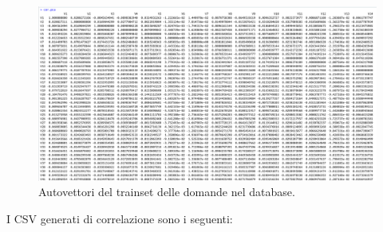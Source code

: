\begin{figure}[H]
\centering
	\includegraphics[width=1\linewidth]{../../PCA/plot/correlazione_rete-db.png}
	\caption{Autovettori del trainset delle domande nel database.}
	\label{Autovettori del trainset delle domande nel database.}
\end{figure}
\noindent

I CSV generati di correlazione sono i seguenti:

